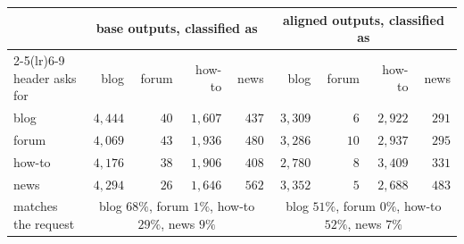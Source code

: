 \begin{table}[tb]
\begin{tabular}{lrrrrrrrr}
 & \multicolumn{4}{c}{base outputs, classified as} & \multicolumn{4}{c}{aligned outputs, classified as} \\
\cmidrule(lr){2-5}\cmidrule(lr){6-9}
header asks for & blog & forum & how-to & news & blog & forum & how-to & news \\ \midrule
blog & $4{,}444$ & $40$ & $1{,}607$ & $437$ & $3{,}309$ & $6$ & $2{,}922$ & $291$ \\
forum & $4{,}069$ & $43$ & $1{,}936$ & $480$ & $3{,}286$ & $10$ & $2{,}937$ & $295$ \\
how-to & $4{,}176$ & $38$ & $1{,}906$ & $408$ & $2{,}780$ & $8$ & $3{,}409$ & $331$ \\
news & $4{,}294$ & $26$ & $1{,}646$ & $562$ & $3{,}352$ & $5$ & $2{,}688$ & $483$ \\
\midrule matches the request & \multicolumn{4}{c}{blog $68\%$, forum $1\%$, how-to $29\%$, news $9\%$} & \multicolumn{4}{c}{blog $51\%$, forum $0\%$, how-to $52\%$, news $7\%$} \\
\bottomrule\end{tabular}
\end{table}
